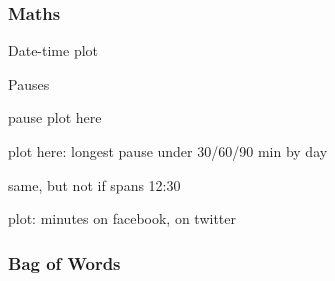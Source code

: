 \begin{frame}
\end{frame}

\begin{frame}
\end{frame}

\begin{frame}
\end{frame}

\begin{frame}
\end{frame}

\begin{frame}
\end{frame}

\begin{frame}
\end{frame}

\begin{frame}
  \frametitle{Maths}
  \vspace{7mm}
  \vspace{7mm}
\end{frame}

\begin{frame}
  Date-time plot
\end{frame}

\begin{frame}
  Pauses
\end{frame}

\begin{frame}
  pause plot here
\end{frame}

\begin{frame}
  plot here: longest pause under 30/60/90 min by day
  
  same, but not if spans 12:30
\end{frame}

\begin{frame}
  plot: minutes on facebook, on twitter
\end{frame}

\begin{frame}
  \frametitle{Bag of Words}
\end{frame}

